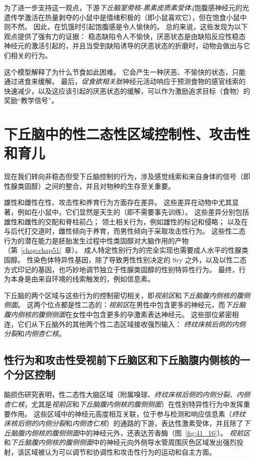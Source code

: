 为了进一步支持这一观点，下游\textit{下丘脑室旁核}-\textit{黑素皮质素受体4}饱腹感神经元的光遗传学激活在热量剥夺的小鼠中是情绪积极的（即小鼠喜欢它），但在饱食小鼠中则不然。
因此，在饥饿时引起饱腹感是令人愉快的。
总的来说，这些发现为以下观点提供了强有力的证据：
稳态缺陷令人不愉快，厌恶状态是由缺陷反应性稳态神经元的激活引起的，并且当受到缺陷诱导的厌恶状态的折磨时，动物会做出与它们相关的行为。


这个模型解释了为什么节食如此困难。
它会产生一种厌恶、不愉快的状态，只能通过进食来缓解。
最后，\textit{促食欲相关肽}神经元活动响应于预测食物的感官线索的快速减少，以及这应该引起的厌恶状态的缓解，可以作为激励追求目标（食物）的奖励“教学信号”。



\section{下丘脑中的性二态性区域控制性、攻击性和育儿}

现在我们转向非稳态但受下丘脑控制的行为，涉及感觉线索和来自身体的信号（即性腺类固醇）之间的整合，并且对物种的生存至关重要。


雄性和雌性在性、攻击性和养育行为方面存在差异。
这些差异在动物中尤其显著，例如在小鼠中，它们显然是天生的（即不需要事先训练）。
这些差异分别包括雄性和雌性的交配和脊柱前凸；
领土相关行为，例如雄性的标记和侵略； 以及在与后代打交道时，雌性倾向于养育，而男性倾向于采取攻击性行为。
这些性二态行为的潜在能力是胚胎发生过程中性类固醇对大脑作用的产物（第~\ref{chap:chap51}~章）。
成人特定性别行为的完全实现也需要成人水平的性腺类固醇。
性染色体特异性基因，除了导致男性性别决定的 Sry 之外，以及以性二态方式印记的基因，也巧妙地调节独立于性腺类固醇的性别特异性行为。
最终，行为本身是由来自环境的线索触发的，例如信息素。


下丘脑的两个区域与这些行为的控制密切相关，即\textit{视前区}和\textit{下丘脑腹内侧核的腹侧侧面}。
这两个位点都是性二态的：\textit{视前区}在男性中包含更多的神经元，而\textit{下丘脑腹内侧核的腹侧侧面}在女性中包含更多的孕激素表达神经元。
这些部位紧密相连，它们从下丘脑外的其他两个性二态区域接收强烈输入：
\textit{终纹床核后侧的内侧分裂}和\textit{内侧杏仁核}。



\subsection{性行为和攻击性受视前下丘脑区和下丘脑腹内侧核的一个分区控制}

脑损伤研究表明，性二态性大脑区域（附属嗅球、\textit{终纹床核后侧的内侧分裂}、\textit{内侧杏仁核}，尤其是\textit{视前区}和\textit{下丘脑腹内侧核的腹侧侧面}）在性别特异性行为中发挥重要作用。
这些区域中的神经元高度相互关联，位于参与检测和响应信息素（\textit{终纹床核后侧的内侧分裂}和\textit{内侧杏仁核}）的通路的下游，表达性激素受体，并且除了\textit{下丘脑腹内侧核的腹侧侧面}中的神经元外，还表达芳香酶（图~\ref{fig:41_16}）。
\textit{视前区}和\textit{下丘脑腹内侧核的腹侧侧面}中的神经元向外侧导水管周围灰色区域发出强烈投射，该区域被认为可以调节和协调性和攻击性行为的运动和自主方面。


